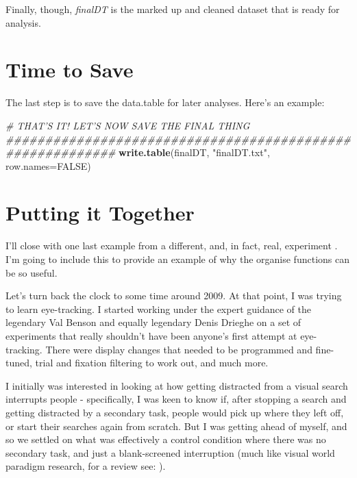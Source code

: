 \documentclass[]{book}
\newenvironment{Shaded}{\begin{snugshade}}{\end{snugshade}}
\newcommand{\CommentTok}[1]{\textcolor[rgb]{0.56,0.35,0.01}{\textit{#1}}}
\newcommand{\DataTypeTok}[1]{\textcolor[rgb]{0.13,0.29,0.53}{#1}}
\newcommand{\KeywordTok}[1]{\textcolor[rgb]{0.13,0.29,0.53}{\textbf{#1}}}
\newcommand{\NormalTok}[1]{#1}
\newcommand{\OtherTok}[1]{\textcolor[rgb]{0.56,0.35,0.01}{#1}}
\newcommand{\StringTok}[1]{\textcolor[rgb]{0.31,0.60,0.02}{#1}}
\begin{document}
Finally, though, \emph{finalDT} is the marked up and cleaned dataset that is ready for analysis.

\hypertarget{time-to-save}{%
\section{Time to Save}\label{time-to-save}}

The last step is to save the data.table for later analyses. Here's an example:

\begin{Shaded}
\begin{Highlighting}[]
\CommentTok{# THAT'S IT! LET'S NOW SAVE THE FINAL THING ##########################################################}
\KeywordTok{write.table}\NormalTok{(finalDT, }\StringTok{"finalDT.txt"}\NormalTok{, }\DataTypeTok{row.names=}\OtherTok{FALSE}\NormalTok{)}
\end{Highlighting}
\end{Shaded}

\hypertarget{putting-it-together}{%
\section{Putting it Together}\label{putting-it-together}}

I'll close with one last example from a different, and, in fact, real, experiment \citep{Godwin2013}. I'm going to include this to provide an example of why the organise functions can be so useful.

Let's turn back the clock to some time around 2009. At that point, I was trying to learn eye-tracking. I started working under the expert guidance of the legendary Val Benson and equally legendary Denis Drieghe on a set of experiments that really shouldn't have been anyone's first attempt at eye-tracking. There were display changes that needed to be programmed and fine-tuned, trial and fixation filtering to work out, and much more.

I initially was interested in looking at how getting distracted from a visual search interrupts people - specifically, I was keen to know if, after stopping a search and getting distracted by a secondary task, people would pick up where they left off, or start their searches again from scratch. But I was getting ahead of myself, and so we settled on what was effectively a control condition where there was no secondary task, and just a blank-screened interruption (much like visual world paradigm research, for a review see: \citep{FERREIRA2008405}).
\end{document}
